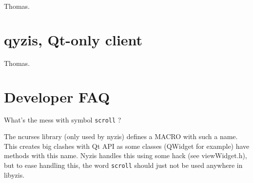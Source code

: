 \documentclass[a4paper,12pt]{report}
\begin{document}
Thomas.

\chapter{qyzis, Qt-only client}

Thomas.

\chapter{Developer FAQ}

What's the mess with symbol \verb+scroll+ ?

The ncurses library (only used by nyzis) defines a MACRO with such a name.
This creates big clashes with Qt API as some classes (QWidget for example)
have methods with this name. Nyzis handles this using some hack (see
viewWidget.h), but to ease handling this, the word \verb+scroll+ should
just not be used anywhere in libyzis.
\end{document}
